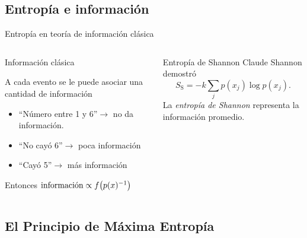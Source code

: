 \subsection{Entropía e información}

\begin{frame}{Entropía en teoría de información clásica}
    \begin{columns}
        \begin{column}{0.5\textwidth}
            \begin{block}{Información clásica}
            \begin{center}
                A cada evento se le puede asociar una cantidad de información\pause
            \end{center}
            \begin{itemize}
                \item ``Número entre 1 y 6''$\rightarrow$ no da información. \pause
                \item ``No cayó 6''$\rightarrow$ poca información\pause
                \item ``Cayó 5''$\rightarrow$ más información\pause
            \end{itemize}
            Entonces $\text{información}\propto f\qty(p(x)^{-1})$
        \end{block}
        \end{column}
        \pause
        \begin{column}{0.5\textwidth}
            \begin{block}{Entropía de Shannon}
            Claude Shannon demostró
            \begin{equation}
                S_{\text{S}}=-k\sum_{j}p(x_{j})\log{p(x_{j})}.\nonumber
            \end{equation}\pause
            La \textit{entropía de Shannon} representa la información promedio.
        \end{block}
        \end{column}
    \end{columns}
\end{frame}

\subsection{El Principio de Máxima Entropía}

